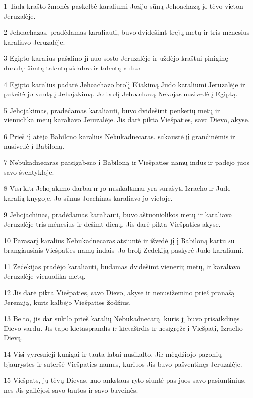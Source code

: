 \par 1 Tada krašto žmonės paskelbė karaliumi Jozijo sūnų Jehoachazą jo tėvo vieton Jeruzalėje. 
\par 2 Jehoachazas, pradėdamas karaliauti, buvo dvidešimt trejų metų ir tris mėnesius karaliavo Jeruzalėje. 
\par 3 Egipto karalius pašalino jį nuo sosto Jeruzalėje ir uždėjo kraštui piniginę duoklę: šimtą talentų sidabro ir talentą aukso. 
\par 4 Egipto karalius padarė Jehoachazo brolį Eliakimą Judo karaliumi Jeruzalėje ir pakeitė jo vardą į Jehojakimą. Jo brolį Jehoachazą Nekojas nusivedė į Egiptą. 
\par 5 Jehojakimas, pradėdamas karaliauti, buvo dvidešimt penkerių metų ir vienuolika metų karaliavo Jeruzalėje. Jis darė pikta Viešpaties, savo Dievo, akyse. 
\par 6 Prieš jį atėjo Babilono karalius Nebukadnecaras, sukaustė jį grandinėmis ir nusivedė į Babiloną. 
\par 7 Nebukadnecaras parsigabeno į Babiloną ir Viešpaties namų indus ir padėjo juos savo šventykloje. 
\par 8 Visi kiti Jehojakimo darbai ir jo nusikaltimai yra surašyti Izraelio ir Judo karalių knygoje. Jo sūnus Joachinas karaliavo jo vietoje. 
\par 9 Jehojachinas, pradėdamas karaliauti, buvo aštuoniolikos metų ir karaliavo Jeruzalėje tris mėnesius ir dešimt dienų. Jis darė pikta Viešpaties akyse. 
\par 10 Pavasarį karalius Nebukadnecaras atsiuntė ir išvedė jį į Babiloną kartu su brangiausiais Viešpaties namų indais. Jo brolį Zedekiją paskyrė Judo karaliumi. 
\par 11 Zedekijas pradėjo karaliauti, būdamas dvidešimt vienerių metų, ir karaliavo Jeruzalėje vienuolika metų. 
\par 12 Jis darė pikta Viešpaties, savo Dievo, akyse ir nenusižemino prieš pranašą Jeremiją, kuris kalbėjo Viešpaties žodžius. 
\par 13 Be to, jis dar sukilo prieš karalių Nebukadnecarą, kuris jį buvo prisaikdinęs Dievo vardu. Jis tapo kietasprandis ir kietaširdis ir nesigręžė į Viešpatį, Izraelio Dievą. 
\par 14 Visi vyresnieji kunigai ir tauta labai nusikalto. Jie mėgdžiojo pagonių bjaurystes ir suteršė Viešpaties namus, kuriuos Jis buvo pašventinęs Jeruzalėje. 
\par 15 Viešpats, jų tėvų Dievas, nuo ankstaus ryto siuntė pas juos savo pasiuntinius, nes Jis gailėjosi savo tautos ir savo buveinės. 
